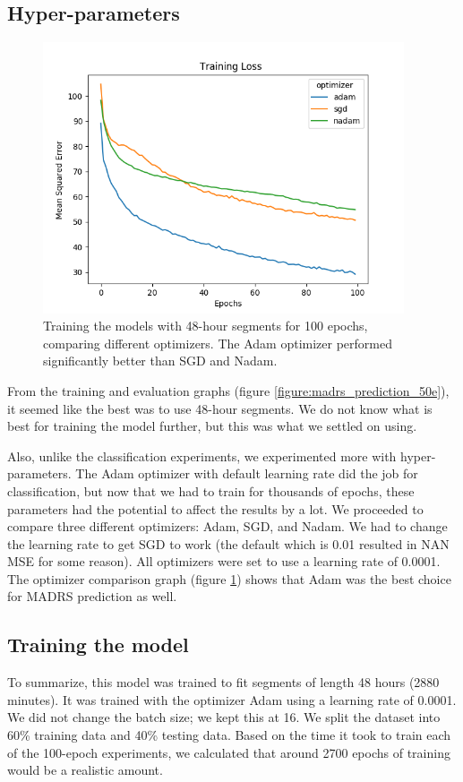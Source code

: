 \subsection{Hyper-parameters}
\begin{figure}
\begin{center}
      \includegraphics[height=8cm]{img/madrs_prediction/optimizers.png}
      \caption{Training the models with 48-hour segments for 100 epochs, comparing different optimizers. The Adam optimizer performed significantly better than SGD and Nadam.}
      \label{figure:madrs_prediction_optimizers}
\end{center}
\end{figure}

\noindent From the training and evaluation graphs (figure \ref{figure:madrs_prediction_50e}), it seemed like the best was to use 48-hour segments. We do not know what is best for training 
the model further, but this was what we settled on using. 

Also, unlike the classification experiments, we experimented more with hyper-parameters. The Adam optimizer with default learning rate did the job for classification, 
but now that we had to train for thousands of epochs, these parameters had the potential to affect the results by a lot. 
We proceeded to compare three different optimizers: Adam, SGD, and Nadam. We had to change the learning rate to get SGD to work 
(the default which is 0.01 \cite{keras_docs} resulted in NAN MSE for some reason). All optimizers were set to use a learning rate of 0.0001. 
The optimizer comparison graph (figure \ref{figure:madrs_prediction_optimizers}) shows that Adam was the best choice for MADRS prediction as well. 


\subsection{Training the model}
To summarize, this model was trained to fit segments of length 48 hours (2880 minutes). It was trained with the optimizer Adam using a learning rate of 0.0001. We did not change the batch size; we kept this at 16. We split the dataset into 60\% training data and 40\% testing data. Based on the time it took to train each of the 100-epoch experiments, we calculated that around 2700 epochs of training would be a realistic amount.

